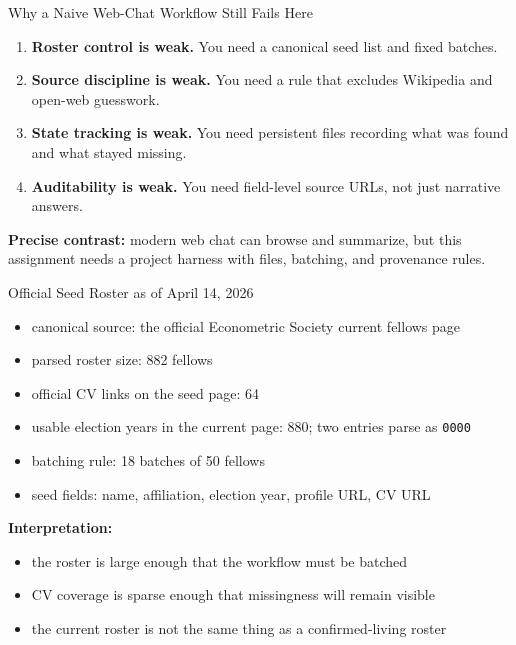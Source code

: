 \documentclass[10pt,english,aspectratio=169]{beamer}
\begin{document}
\begin{frame}{Why a Naive Web-Chat Workflow Still Fails Here}
\begin{enumerate}
    \item \textbf{Roster control is weak.} You need a canonical seed list and fixed batches.
    \item \textbf{Source discipline is weak.} You need a rule that excludes Wikipedia and open-web guesswork.
    \item \textbf{State tracking is weak.} You need persistent files recording what was found and what stayed missing.
    \item \textbf{Auditability is weak.} You need field-level source URLs, not just narrative answers.
\end{enumerate}

\vspace{0.25cm}
\textbf{Precise contrast:} modern web chat can browse and summarize, but this assignment needs a project harness with files, batching, and provenance rules.
\end{frame}

\begin{frame}{Official Seed Roster as of April 14, 2026}
\begin{itemize}
    \item canonical source: the official Econometric Society current fellows page
    \item parsed roster size: 882 fellows
    \item official CV links on the seed page: 64
    \item usable election years in the current page: 880; two entries parse as \texttt{0000}
    \item batching rule: 18 batches of 50 fellows
    \item seed fields: name, affiliation, election year, profile URL, CV URL
\end{itemize}

\vspace{0.25cm}
\textbf{Interpretation:}
\begin{itemize}
    \item the roster is large enough that the workflow must be batched
    \item CV coverage is sparse enough that missingness will remain visible
    \item the current roster is not the same thing as a confirmed-living roster
\end{itemize}
\end{frame}
\end{document}
